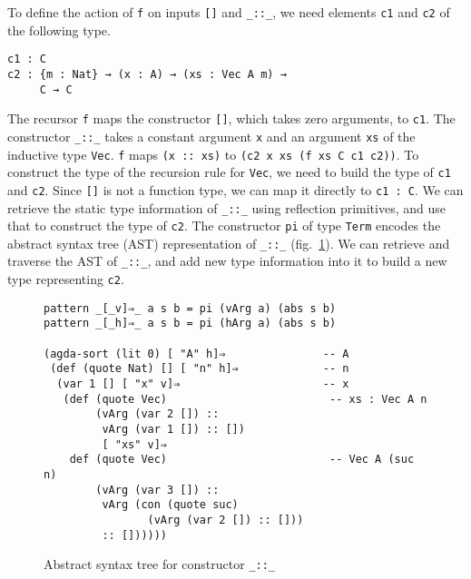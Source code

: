 \documentclass[sigplan,10pt]{acmart}
\begin{document}
To define the action of {\tt f} on inputs {\tt []} and {\tt \_::\_}, we need elements {\tt c1} and {\tt c2} of the following type.

\begin{center}
\begingroup
\begin{BVerbatim}
c1 : C
c2 : {m : Nat} → (x : A) → (xs : Vec A m) → 
     C → C
\end{BVerbatim}
\endgroup
\end{center}
\normalsize


The recursor {\tt f} maps the constructor {\tt []}, which takes zero arguments, to {\tt c1}. The constructor {\tt \_::\_} takes a constant argument {\tt x} and an argument {\tt xs} of the inductive type {\tt Vec}. {\tt f} maps {\tt (x :: xs)} to {\tt (c2 x xs (f xs C c1 c2))}. To construct the type of the recursion rule for {\tt Vec}, we need to build the type of {\tt c1} and {\tt c2}. Since {\tt []} is not a function type, we can map it directly to {\tt c1 : C}. We can retrieve the static type information of {\tt \_::\_} using reflection primitives, and use that to construct the type of {\tt c2}. The constructor {\tt pi} of type {\tt Term} encodes the abstract syntax tree (AST) representation of {\tt \_::\_} (fig.~\ref{fig:ast-g}). We can retrieve and traverse the AST of {\tt \_::\_}, and add new type information into it to build a new type representing {\tt c2}.

\begin{figure}
\begin{center}
\begingroup
\fontsize{7pt}{9pt}\selectfont
\begin{Verbatim}[frame = single]
pattern _[_v]⇒_ a s b = pi (vArg a) (abs s b)
pattern _[_h]⇒_ a s b = pi (hArg a) (abs s b)

(agda-sort (lit 0) [ "A" h]⇒               -- A
 (def (quote Nat) [] [ "n" h]⇒             -- n
  (var 1 [] [ "x" v]⇒                      -- x
   (def (quote Vec)                         -- xs : Vec A n
        (vArg (var 2 []) ::
         vArg (var 1 []) :: [])
         [ "xs" v]⇒
    def (quote Vec)                         -- Vec A (suc n)
        (vArg (var 3 []) ::
         vArg (con (quote suc)
                (vArg (var 2 []) :: []))
         :: [])))))
\end{Verbatim}
\endgroup
\end{center}
\caption{Abstract syntax tree for constructor {\tt \_::\_}}
\label{fig:ast-g}
\end{figure}
\end{document}
